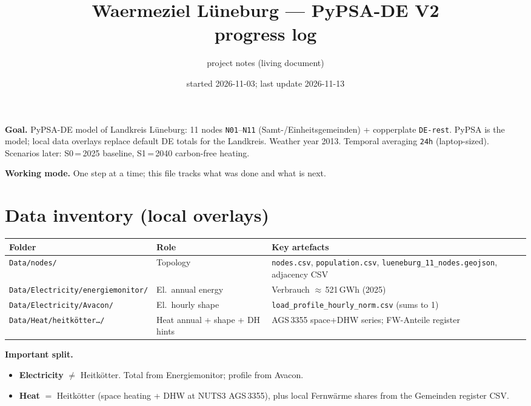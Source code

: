 \documentclass[11pt,a4paper]{article}
\title{Waermeziel Lüneburg --- PyPSA-DE V2\\progress log}
\author{project notes (living document)}
\date{started 2026-11-03; last update 2026-11-13}
\begin{document}
\maketitle

\noindent\textbf{Goal.}
PyPSA-DE model of Landkreis Lüneburg:
11 nodes \texttt{N01}--\texttt{N11} (Samt-/Einheitsgemeinden) + copperplate \texttt{DE-rest}.
PyPSA is the model; local data overlays replace default DE totals for the Landkreis.
Weather year 2013. Temporal averaging \texttt{24h} (laptop-sized).
Scenarios later: S0\,=\,2025 baseline, S1\,=\,2040 carbon-free heating.

\noindent\textbf{Working mode.}
One step at a time; this file tracks what was done and what is next.

\tableofcontents
\vspace{1em}

\section{Data inventory (local overlays)}

\begin{center}
\begin{tabular}{@{}llp{6.2cm}@{}}
\toprule
Folder & Role & Key artefacts \\
\midrule
\texttt{Data/nodes/} & Topology & \texttt{nodes.csv}, \texttt{population.csv},
  \texttt{lueneburg\_11\_nodes.geojson}, adjacency CSV \\
\texttt{Data/Electricity/energiemonitor/} & El.\ annual energy & Verbrauch $\approx$\,521\,GWh (2025) \\
\texttt{Data/Electricity/Avacon/} & El.\ hourly shape & \texttt{load\_profile\_hourly\_norm.csv} (sums to 1) \\
\texttt{Data/Heat/heitkötter\ldots/} & Heat annual + shape + DH hints & AGS\,3355 space+DHW series; FW-Anteile register \\
\bottomrule
\end{tabular}
\end{center}

\textbf{Important split.}
\begin{itemize}[leftmargin=*]
  \item \textbf{Electricity} $\neq$ Heitkötter.
        Total from Energiemonitor; profile from Avacon.
  \item \textbf{Heat} $=$ Heitkötter (space heating + DHW at NUTS3 AGS\,3355),
        plus local Fernwärme shares from the Gemeinden register CSV.
\end{itemize}
\end{document}
